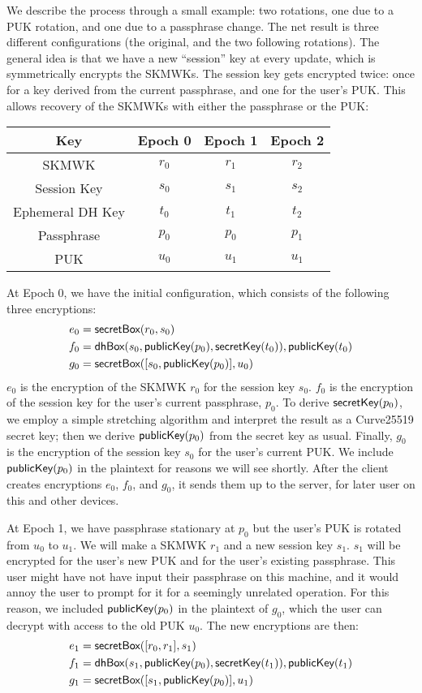 We describe the process through a small example: two rotations, one due to a PUK rotation,
and one due to a passphrase change. The net result is three different configurations
(the original, and the two following rotations). The general idea is that we have a new ``session''
key at every update, which is symmetrically encrypts the SKMWKs. The session key gets encrypted
twice: once for a key derived from the current passphrase, and one for the user's PUK. This
allows recovery of the SKMWKs with either the passphrase or the PUK:
%
  \begin{center}
  \begin{tabular}{|c|c|c|c|}
    \hline
     Key & Epoch 0 & Epoch 1 & Epoch 2 \\
     \hline
     \hline
      SKMWK & $r_0$ & $r_1$ & $r_2$ \\
      Session Key & $s_0$ & $s_1$ & $s_2$ \\
      Ephemeral DH Key & $t_0$ & $t_1$ & $t_2$ \\
      Passphrase & $p_0$ & $p_0$ & $p_1$ \\
      PUK & $u_0$ & $u_1$ & $u_1$ \\
     \hline
  \end{tabular}
\end{center}
%
At Epoch 0, we have the initial configuration, which consists of the following three encryptions:
%
\begin{align*}
e_0 &= \textsf{secretBox}(r_0, s_0) \\
f_0 &= \textsf{dhBox}(s_0, \textsf{publicKey}(p_0), \textsf{secretKey}(t_0)), \textsf{publicKey}(t_0) \\
g_0 &= \textsf{secretBox}([s_0,\textsf{publicKey}(p_0)], u_0) \\
\end{align*}
%
$e_0$ is the encryption of the SKMWK $r_0$ for the session key $s_0$.  $f_0$ is the encryption 
of the session key for the user's current passphrase, $p_0$. To derive $\textsf{secretKey}(p_0)$, we employ
a simple stretching algorithm and interpret the result as a Curve25519 secret key; then we
derive $\textsf{publicKey}(p_0)$ from the secret key as usual. Finally, $g_0$ is the encryption of the session
key $s_0$ for the user's current PUK. We include $\textsf{publicKey}(p_0)$ in the plaintext for reasons
we will see shortly. After the client creates encryptions $e_0$, $f_0$, and $g_0$, it sends them
up to the server, for later user on this and other devices.

At Epoch 1, we have passphrase stationary at $p_0$  but the user's PUK is rotated from $u_0$ to $u_1$.
We will make a SKMWK $r_1$ and a new session key $s_1$. $s_1$ will be encrypted for the user's
new PUK and for the user's existing passphrase. This user might have not have input their
passphrase on this machine, and it would annoy the user to prompt for it for a seemingly
unrelated operation. For this reason, we included $\textsf{publicKey}(p_0)$ in the plaintext of $g_0$, which
the user can decrypt with access to the old PUK $u_0$. The new encryptions are then:
%
\begin{align*}
e_1 &= \textsf{secretBox}([r_0,r_1], s_1) \\
f_1 &= \textsf{dhBox}(s_1, \textsf{publicKey}(p_0), \textsf{secretKey}(t_1)), \textsf{publicKey}(t_1) \\
g_1 &= \textsf{secretBox}([s_1,\textsf{publicKey}(p_0)], u_1) \\
\end{align*}

